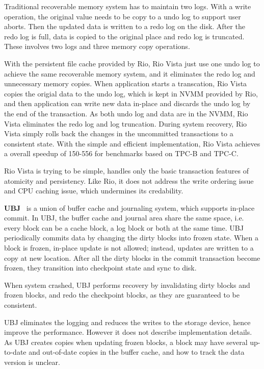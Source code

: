 Traditional recoverable memory system has to maintain two logs. With a write
operation, the original value needs to be copy to a undo log to support user
aborts. Then the updated data is written to a redo log on the disk. After
the redo log is full, data is copied to the original place and redo log is
truncated. These involves two logs and three memory copy operations.

With the persistent file cache provided by Rio,
Rio Vista just use one undo log to achieve the same recoverable memory system,
and it eliminates the redo log
and unnecessary memory copies. When
application starts a transcation, Rio Vista copies the origial data to the 
undo log, which is kept in NVMM provided by Rio, and then application can
write new data in-place and discards the undo log by the end of the transaction.
As both undo log and data are in the NVMM, Rio Vista eliminates the redo log and
log truncation. During system recovery, Rio Vista simply rolls back the changes
in the uncommitted transactions to a consistent state.
With the simple and efficient implementation, Rio Vista
achieves a overall speedup of 150-556\x{} for benchmarks based on TPC-B and
TPC-C.

Rio Vista is trying to be simple, handles only the basic transaction features
of atomicity and persistency. Like Rio, it does not address the write ordering
issue and CPU caching issue, which undermines its credability. 

\textbf{UBJ}~\cite{UBJ} is a union of buffer cache and journaling system,
which supports in-place commit. In UBJ, the buffer cache and journal area
share the same space, i.e. every block can be a cache block, a log block
or both at the same time. UBJ periodically commits data by changing the dirty
blocks into frozen state. When a block is frozen, in-place update is not
allowed; instead, updates are written to a copy at new location. After all
the dirty blocks in the commit transaction become frozen, they transition
into checkpoint state and sync to disk.

When system crashed, UBJ performs recovery by invalidating dirty blocks and 
frozen blocks, and redo the checkpoint blocks, as they are guaranteed to be
consistent. 

UBJ eliminates the logging and reduces the writes to the storage device,
hence improve the performance. However it does not describe implementation
details. As UBJ creates copies when updating frozen blocks, a block may
have several up-to-date and out-of-date copies in the buffer cache, and
how to track the data version is unclear.

